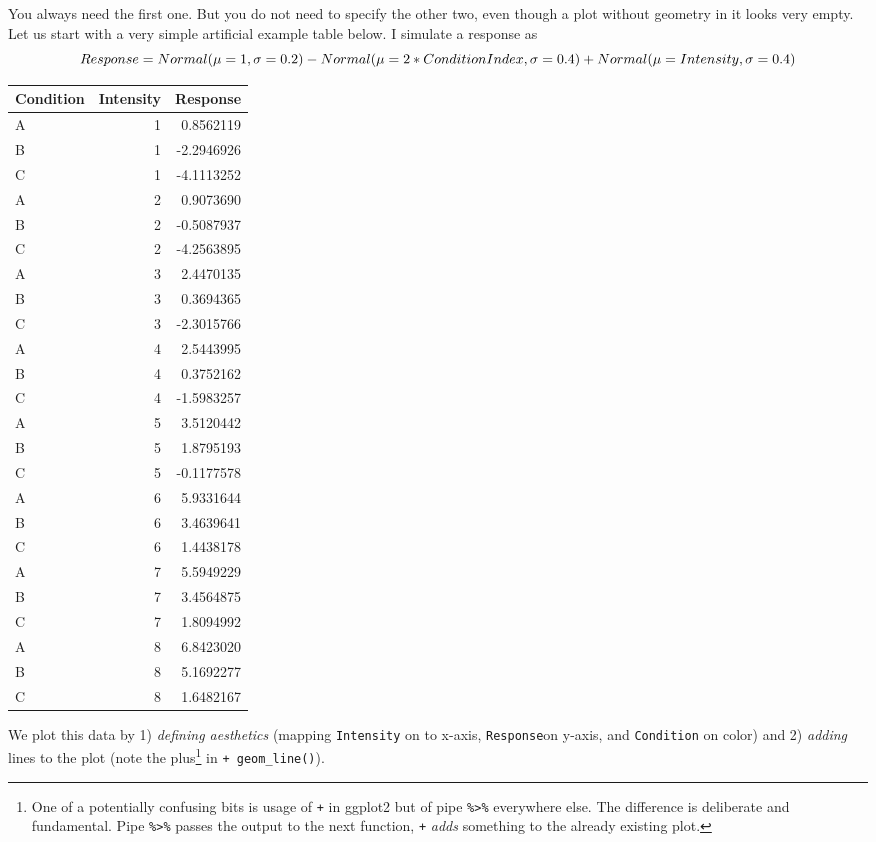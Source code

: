 \documentclass[
]{book}
\begin{document}
You always need the first one. But you do not need to specify the other two, even though a plot without geometry in it looks very empty. Let us start with a very simple artificial example table below. I simulate a response as
\[Response = Normal(\mu=1, \sigma=0.2) - \\
Normal(\mu=2*ConditionIndex, \sigma=0.4) + \\ Normal(\mu=Intensity, \sigma=0.4)\]

\begin{tabular}{l|r|r}
\hline
Condition & Intensity & Response\\
\hline
A & 1 & 0.8562119\\
\hline
B & 1 & -2.2946926\\
\hline
C & 1 & -4.1113252\\
\hline
A & 2 & 0.9073690\\
\hline
B & 2 & -0.5087937\\
\hline
C & 2 & -4.2563895\\
\hline
A & 3 & 2.4470135\\
\hline
B & 3 & 0.3694365\\
\hline
C & 3 & -2.3015766\\
\hline
A & 4 & 2.5443995\\
\hline
B & 4 & 0.3752162\\
\hline
C & 4 & -1.5983257\\
\hline
A & 5 & 3.5120442\\
\hline
B & 5 & 1.8795193\\
\hline
C & 5 & -0.1177578\\
\hline
A & 6 & 5.9331644\\
\hline
B & 6 & 3.4639641\\
\hline
C & 6 & 1.4438178\\
\hline
A & 7 & 5.5949229\\
\hline
B & 7 & 3.4564875\\
\hline
C & 7 & 1.8094992\\
\hline
A & 8 & 6.8423020\\
\hline
B & 8 & 5.1692277\\
\hline
C & 8 & 1.6482167\\
\hline
\end{tabular}

We plot this data by 1) \emph{defining aesthetics} (mapping \texttt{Intensity} on to x-axis, \texttt{Response}on y-axis, and \texttt{Condition} on color) and 2) \emph{adding} lines to the plot (note the plus\footnote{One of a potentially confusing bits is usage of \texttt{+} in ggplot2 but of pipe \texttt{\%\textgreater{}\%} everywhere else. The difference is deliberate and fundamental. Pipe \texttt{\%\textgreater{}\%} passes the output to the next function, \texttt{+} \emph{adds} something to the already existing plot.} in \texttt{+\ geom\_line()}).
\end{document}
